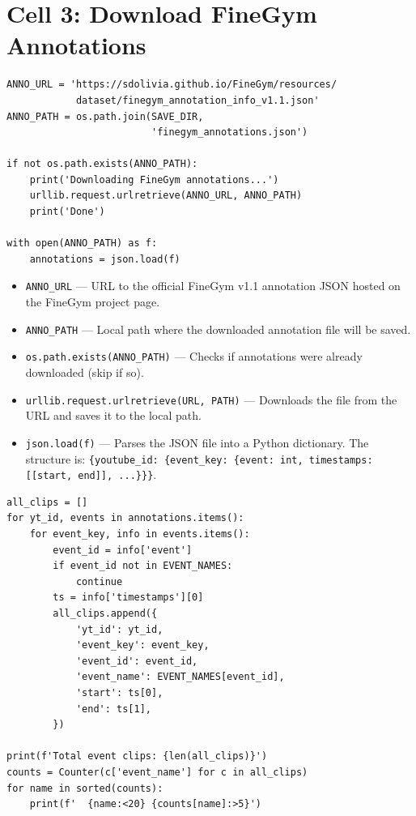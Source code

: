 \newpage
\section{Cell 3: Download FineGym Annotations}

\begin{lstlisting}
ANNO_URL = 'https://sdolivia.github.io/FineGym/resources/
            dataset/finegym_annotation_info_v1.1.json'
ANNO_PATH = os.path.join(SAVE_DIR,
                         'finegym_annotations.json')

if not os.path.exists(ANNO_PATH):
    print('Downloading FineGym annotations...')
    urllib.request.urlretrieve(ANNO_URL, ANNO_PATH)
    print('Done')

with open(ANNO_PATH) as f:
    annotations = json.load(f)
\end{lstlisting}

\begin{explanation}
\begin{itemize}[nosep]
  \item \texttt{ANNO\_URL} --- URL to the official FineGym v1.1 annotation JSON hosted on the FineGym project page.
  \item \texttt{ANNO\_PATH} --- Local path where the downloaded annotation file will be saved.
  \item \texttt{os.path.exists(ANNO\_PATH)} --- Checks if annotations were already downloaded (skip if so).
  \item \texttt{urllib.request.urlretrieve(URL, PATH)} --- Downloads the file from the URL and saves it to the local path.
  \item \texttt{json.load(f)} --- Parses the JSON file into a Python dictionary. The structure is: \texttt{\{youtube\_id: \{event\_key: \{event: int, timestamps: [[start, end]], ...\}\}\}}.
\end{itemize}
\end{explanation}

\begin{lstlisting}
all_clips = []
for yt_id, events in annotations.items():
    for event_key, info in events.items():
        event_id = info['event']
        if event_id not in EVENT_NAMES:
            continue
        ts = info['timestamps'][0]
        all_clips.append({
            'yt_id': yt_id,
            'event_key': event_key,
            'event_id': event_id,
            'event_name': EVENT_NAMES[event_id],
            'start': ts[0],
            'end': ts[1],
        })

print(f'Total event clips: {len(all_clips)}')
counts = Counter(c['event_name'] for c in all_clips)
for name in sorted(counts):
    print(f'  {name:<20} {counts[name]:>5}')
\end{lstlisting}


